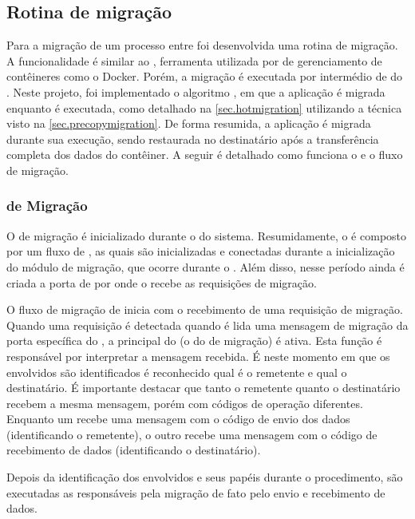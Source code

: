 \subsection{Rotina de migração}
\label{sec.rotina-migracao}

Para a migração de um processo entre \clusters foi desenvolvida uma rotina de migração. A funcionalidade é similar ao \criu, ferramenta utilizada por \softwares de gerenciamento de contêineres como o Docker. Porém, a migração é executada por intermédio de \daemons do \os. Neste projeto, foi implementado o algoritmo \hotmigration, em que a aplicação é migrada enquanto é executada, como detalhado na \autoref{sec.hotmigration} utilizando a técnica \precopy visto na \autoref{sec.precopymigration}. De forma resumida, a aplicação é migrada durante sua execução, sendo restaurada no \cluster destinatário após a transferência completa dos dados do contêiner. A seguir é detalhado como funciona o \daemon e o fluxo de migração.

\subsubsection{\Daemon de Migração}

O \daemon de migração é inicializado durante o \boot do sistema. Resumidamente, o \daemon é composto por um fluxo de \tasks, as quais são inicializadas e conectadas durante a inicialização do módulo de migração, que ocorre durante o \boot. Além disso, nesse período ainda é criada a porta de \mailbox por onde o \daemon recebe as requisições de migração.
    
O fluxo de migração de inicia com o recebimento de uma requisição de migração. Quando uma requisição é detectada \ie quando é lida uma mensagem de migração da porta específica do \daemon, a \task principal do \daemon (o \handler do \daemon de migração) é ativa. Esta função é responsável por interpretar a mensagem recebida. É neste momento em que os \clusters envolvidos são identificados \ie é reconhecido qual é o \cluster remetente e qual o \cluster destinatário. É importante destacar que tanto o \cluster remetente quanto o destinatário recebem a mesma mensagem, porém com códigos de operação diferentes. Enquanto um recebe uma mensagem com o código de envio dos dados (identificando o remetente), o outro recebe uma mensagem com o código de recebimento de dados (identificando o destinatário).

Depois da identificação dos \clusters envolvidos e seus papéis durante o procedimento, são executadas as \tasks responsáveis pela migração de fato \ie pelo envio e recebimento de dados.



